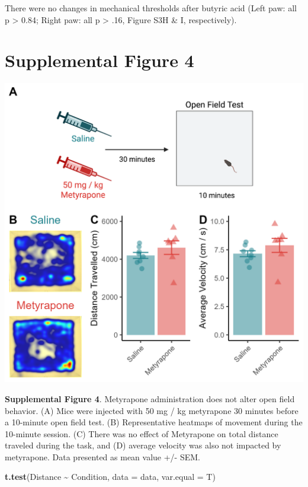 \documentclass[
]{book}
\newenvironment{Shaded}{\begin{snugshade}}{\end{snugshade}}
\newcommand{\AttributeTok}[1]{\textcolor[rgb]{0.13,0.29,0.53}{#1}}
\newcommand{\FunctionTok}[1]{\textcolor[rgb]{0.13,0.29,0.53}{\textbf{#1}}}
\newcommand{\NormalTok}[1]{#1}
\newcommand{\SpecialCharTok}[1]{\textcolor[rgb]{0.81,0.36,0.00}{\textbf{#1}}}
\begin{document}
There were no changes in mechanical thresholds after butyric acid (Left paw: all p \textgreater{} 0.84; Right paw: all p \textgreater{} .16, Figure S3H \& I, respectively).

\chapter*{Supplemental Figure 4}\label{supplemental-figure-4}

\includegraphics[width=20.83in]{Figs/S4_OFT}

\textbf{Supplemental Figure 4}. Metyrapone administration does not alter open field behavior. (A) Mice were injected with 50 mg / kg metyrapone 30 minutes before a 10-minute open field test. (B) Representative heatmaps of movement during the 10-minute session. (C) There was no effect of Metyrapone on total distance traveled during the task, and (D) average velocity was also not impacted by metyrapone. Data presented as mean value +/- SEM.

\begin{Shaded}
\begin{Highlighting}[]
\FunctionTok{t.test}\NormalTok{(Distance }\SpecialCharTok{\textasciitilde{}}\NormalTok{ Condition, }\AttributeTok{data =}\NormalTok{ data, }\AttributeTok{var.equal =}\NormalTok{ T)}
\end{Highlighting}
\end{Shaded}
\end{document}
